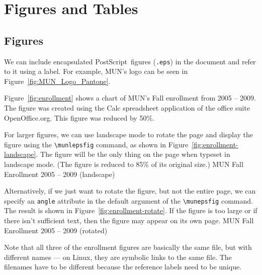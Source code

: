 \chapter{Figures and Tables}
\label{chap:figtab}

\section{Figures}

We can include encapsulated PostScript\texttrademark\ figures
(\texttt{.eps}) in the document and refer to it using a label.
For example, MUN's logo can be seen in Figure~\ref{fig:MUN_Logo_Pantone}.

Figure~\ref{fig:enrollment} shows a chart of MUN's Fall
enrollment from 2005 -- 2009.
The figure was created using the \textsf{Calc} spreadsheet application of
the office suite \textsf{OpenOffice.org}.  This figure was reduced by 50\%.

For larger figures, we can use landscape mode to rotate the page
and display the figure using the \verb+\munlepsfig+ command, as shown
in Figure~\ref{fig:enrollment-landscape}.  The figure will be the
only thing on the page when typeset in landscape mode. 
(The figure is reduced to 85\% of its original size.)
	{MUN Fall Enrollment 2005 -- 2009 (landscape)}

Alternatively, if we just want to rotate the figure, but not 
the entire page, we can specify an \texttt{angle} attribute
in the default argument of the \verb+\munepsfig+ command.
The result is shown in Figure~\ref{fig:enrollment-rotate}.
If the figure is too large or if there isn't sufficient
text, then the figure may appear on its own page.
	{MUN Fall Enrollment 2005 -- 2009 (rotated)}

Note that all three of the enrollment figures are basically
the same file, but with different names --- on Linux, they are
symbolic links to the same file.  The filenames have to be different
because the reference labels need to be unique.

